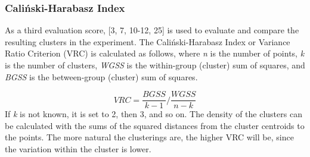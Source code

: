 \subsubsection{Caliński-Harabasz Index}
As a third evaluation score, \textcite{calinskiHarabasz}[3, 7, 10-12, 25] is used to evaluate and compare the resulting clusters in the experiment. 
The Caliński-Harabasz Index or Variance Ratio Criterion (VRC) is calculated as follows, where \textit{n} is the number of points, \textit{k} is the number of clusters, \textit{WGSS} is the within-group (cluster) sum of squares, and \textit{BGSS} is the between-group (cluster) sum of squares.

\[
VRC = \frac{BGSS}{k-1}/\frac{WGSS}{n-k}
\]
If \textit{k} is not known, it is set to 2, then 3, and so on. The density of the clusters can be calculated with the sums of the squared distances from the cluster centroids to the points. The more natural the clusterings are, the higher VRC will be, since the variation within the cluster is lower.


